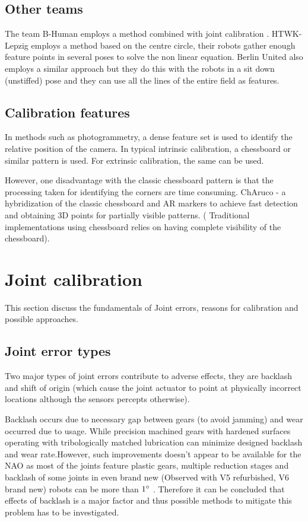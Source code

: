 \documentclass[english, printversion, nomenclature, notitle]{tuvisionthesis} %
\begin{document}
\subsection{Other teams}
The team B-Human employs a method combined with joint calibration . HTWK-Lepzig employs a method based on the centre circle, their robots gather enough feature points in several poses to solve the non linear equation. Berlin United also employs a similar approach but they do this with the robots in a sit down (unstiffed) pose and they can use all the lines of the entire field as features.

\subsection{Calibration features}

In methods such as photogrammetry, a dense feature set is used to identify the relative position of the camera. In typical intrinsic calibration, a chessboard or similar pattern is used. For extrinsic calibration, the same can be used.

However, one disadvantage with the classic chessboard pattern is that the processing taken for identifying the corners are time consuming. ChAruco - a hybridization of the classic chessboard and AR markers to achieve fast detection and obtaining 3D points for partially visible patterns. ( Traditional implementations using chessboard relies on having complete visibility of the chessboard).  

\section{Joint calibration}
This section discuss the fundamentals of Joint errors, reasons for calibration and possible approaches.

\subsection{Joint error types}
Two major types of joint errors contribute to adverse effects, they are backlash and shift of origin (which cause the joint actuator to point at physically incorrect locations although the sensors percepts otherwise). 

Backlash occurs due to necessary gap between gears (to avoid jamming) and wear occurred due to usage. While precision machined gears with hardened surfaces operating with tribologically matched lubrication can minimize designed backlash and wear rate.However, such improvements doesn't appear to be available for the NAO as most of the joints feature plastic gears, multiple reduction stages and backlash of some joints in even brand new (Observed with V5 refurbished, V6 brand new) robots can be more than $1\degree$ . Therefore it can be concluded that effects of backlash is a major factor and thus possible methods to mitigate this problem has to be investigated.
\end{document}
